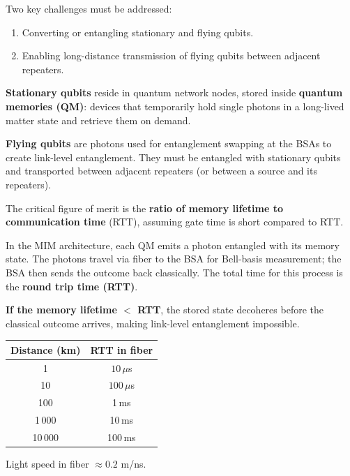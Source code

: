 \documentclass[10pt,a4paper]{article}
\begin{document}
Two key challenges must be addressed:
\begin{enumerate}[leftmargin=*, nosep]
  \item Converting or entangling stationary and flying qubits.
  \item Enabling long-distance transmission of flying qubits between adjacent repeaters.
\end{enumerate}

\begin{tcolorbox}[defstyle, title={Stationary and Flying Qubits}]
\textbf{Stationary qubits} reside in quantum network nodes, stored inside \textbf{quantum memories (QM)}: devices that temporarily hold single photons in a long-lived matter state and retrieve them on demand.

\textbf{Flying qubits} are photons used for entanglement swapping at the BSAs to create link-level entanglement. They must be entangled with stationary qubits and transported between adjacent repeaters (or between a source and its repeaters).
\end{tcolorbox}

\begin{tcolorbox}[propstyle, title={Memory Lifetime vs.\ Round Trip Time}]
The critical figure of merit is the \textbf{ratio of memory lifetime to communication time} (RTT), assuming gate time is short compared to RTT.

In the MIM architecture, each QM emits a photon entangled with its memory state. The photons travel via fiber to the BSA for Bell-basis measurement; the BSA then sends the outcome back classically. The total time for this process is the \textbf{round trip time (RTT)}.

\textbf{If the memory lifetime $< $ RTT}, the stored state decoheres before the classical outcome arrives, making link-level entanglement impossible.

\medskip
\begin{center}
\begin{tabular}{cc}
\hline
\textbf{Distance (km)} & \textbf{RTT in fiber} \\
\hline
1       & $10\,\mu$s   \\
10      & $100\,\mu$s  \\
100     & 1\,ms        \\
1\,000  & 10\,ms       \\
10\,000 & 100\,ms      \\
\hline
\end{tabular}
\end{center}
\smallskip
Light speed in fiber $\approx 0.2$ m/ns.
\end{tcolorbox}
\end{document}
